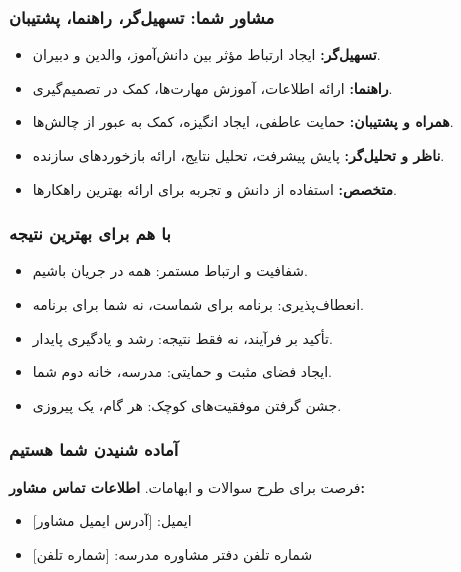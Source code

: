 \documentclass[aspectratio=169]{beamer}
\begin{document}
\begin{frame}[fragile]
  \frametitle{مشاور شما: تسهیل‌گر، راهنما، پشتیبان}
  \begin{itemize}
    \item \textbf{تسهیل‌گر:} ایجاد ارتباط مؤثر بین دانش‌آموز، والدین و دبیران.
    \item \textbf{راهنما:} ارائه اطلاعات، آموزش مهارت‌ها، کمک در تصمیم‌گیری.
    \item \textbf{همراه و پشتیبان:} حمایت عاطفی، ایجاد انگیزه، کمک به عبور از چالش‌ها.
    \item \textbf{ناظر و تحلیل‌گر:} پایش پیشرفت، تحلیل نتایج، ارائه بازخوردهای سازنده.
    \item \textbf{متخصص:} استفاده از دانش و تجربه برای ارائه بهترین راهکارها.
  \end{itemize}
\end{frame}

\begin{frame}[fragile]
  \frametitle{با هم برای بهترین نتیجه}
  \begin{itemize}
    \item شفافیت و ارتباط مستمر: همه در جریان باشیم.
    \item انعطاف‌پذیری: برنامه برای شماست، نه شما برای برنامه.
    \item تأکید بر فرآیند، نه فقط نتیجه: رشد و یادگیری پایدار.
    \item ایجاد فضای مثبت و حمایتی: مدرسه، خانه دوم شما.
    \item جشن گرفتن موفقیت‌های کوچک: هر گام، یک پیروزی.
  \end{itemize}
\end{frame}

\begin{frame}[fragile]
  \frametitle{آماده شنیدن شما هستیم}
  \Large %
  \centering
  فرصت برای طرح سوالات و ابهامات.
  \bigskip
  \normalsize %
  \textbf{اطلاعات تماس مشاور:}
  \begin{itemize}
      \item ایمیل: [آدرس ایمیل مشاور]
      \item شماره تلفن دفتر مشاوره مدرسه: [شماره تلفن]
  \end{itemize}
  \vfill %
\end{frame}
\end{document}
